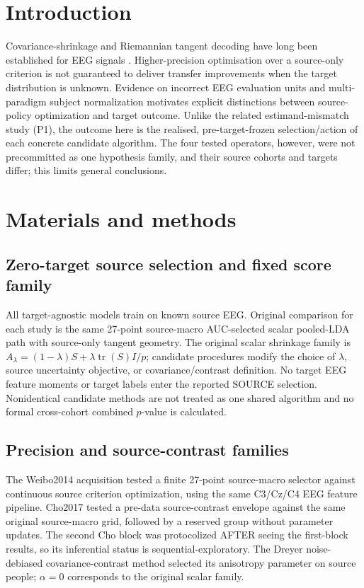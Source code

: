 \documentclass[11pt,a4paper]{article}
\begin{document}
\section{Introduction}
Covariance-shrinkage and Riemannian tangent decoding have
long been established for EEG signals
\cite{barachant2012,jayaram2018moabb}.
Higher-precision optimisation over a source-only criterion
is not guaranteed to deliver transfer improvements when the
target distribution is unknown. Evidence on incorrect
EEG evaluation units \cite{gil2026subjectvalidation} and
multi-paradigm subject normalization
\cite{qin2026spatialnorm} motivates explicit distinctions
between source-policy optimization and target outcome.
Unlike the related estimand-mismatch study (P1),
the outcome here is the realised, pre-target-frozen
selection/action of each concrete candidate algorithm.
The four tested operators, however, were not
precommitted as one hypothesis family, and their source
cohorts and targets differ; this limits general conclusions.

\section{Materials and methods}
\subsection{Zero-target source selection and fixed score family}
All target-agnostic models train on known source EEG.
Original comparison for each study is the same
27-point source-macro AUC-selected scalar pooled-LDA
path with source-only tangent geometry.
The original scalar shrinkage family is
$A_{\lambda}=(1-\lambda)S+\lambda\operatorname{tr}(S)I/p$;
candidate procedures modify the choice of $\lambda$,
source uncertainty objective, or covariance/contrast
definition. No target EEG feature moments or target labels
enter the reported SOURCE selection. Nonidentical
candidate methods are not treated as one shared
algorithm and no formal cross-cohort combined $p$-value
is calculated.

\subsection{Precision and source-contrast families}
The Weibo2014 acquisition tested a finite 27-point
source-macro selector against continuous source criterion
optimization, using the same C3/Cz/C4 EEG feature
pipeline. Cho2017 tested a pre-data source-contrast
envelope against the same original source-macro grid,
followed by a reserved group without parameter updates.
The second Cho block was protocolized AFTER seeing
the first-block results, so its inferential status is
sequential-exploratory. The Dreyer noise-debiased
covariance-contrast method selected its anisotropy
parameter on source people; $\alpha=0$ corresponds
to the original scalar family.
\end{document}

